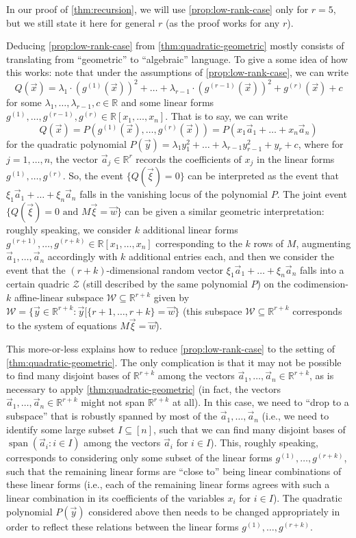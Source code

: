 \documentclass[english]{article}
\theoremstyle{remark}
\numberwithin{equation}{section}
\numberwithin{figure}{section}
\newcommand{\RR}{\mathbb{R}}
\newcommand{\mb}{\mathbb}
\newcommand{\mc}{\mathcal}
\newcommand{\on}{\operatorname}
\begin{document}
In our proof of \cref{thm:recursion}, we will use \cref{prop:low-rank-case} only for $r=5$, but we still state it here for general $r$ (as the proof works for any $r$).

Deducing \cref{prop:low-rank-case} from \cref{thm:quadratic-geometric} mostly consists of translating from ``geometric'' to ``algebraic'' language.
To give a some idea of how this works: note that under the assumptions of \cref{prop:low-rank-case}, we can write \[Q(\vec x)=\lambda_{1}\cdot (g^{({1})}(\vec{x}))^2+\dots+\lambda_{r-1} \cdot (g^{({r-1})}(\vec{x}))^2+g^{(r)}(\vec x)+c\] for some $\lambda_1,\dots,\lambda_{r-1},c\in \RR$ and some linear forms $g^{({1})},\dots,g^{({r-1})},g^{(r)} \in \mathbb{R}[x_1,\dots,x_n]$. That is to say, we can write
\[Q(\vec x)=P(g^{(1)}(\vec{x}),\dots,g^{(r)}(\vec{x}))=P(x_1\vec a_1+\dots+x_n\vec a_n)\]
for the quadratic polynomial $P(\vec{y})=\lambda_1 y_1^2+\dots+\lambda_{r-1} y_{r-1}^2+y_r+c$, where for $j=1,\dots,n$, the vector $\vec a_j\in \mb R^r$ records the coefficients of $x_j$ in the linear forms $g^{({1})},\dots,g^{(r)}$. So, the event $\{Q(\vec \xi)=0\}$ can be interpreted as the event that $\xi_1\vec a_1+\dots+\xi_n\vec a_n$ falls in the vanishing locus of the polynomial $P$. The joint event $\{Q(\vec \xi)=0\text{ and }M\vec\xi=\vec w \}$ can be given a similar geometric interpretation: roughly speaking, we consider $k$ additional linear forms $g^{({r+1})},\dots,g^{({r+k})}\in \mathbb{R}[x_1,\dots,x_n]$ corresponding to the $k$ rows of $M$,
augmenting $\vec a_1,\dots,\vec a_n$ accordingly with $k$ additional entries each, and then we consider the event that the $(r+k)$-dimensional random vector $\xi_1\vec a_1+\dots+\xi_n\vec a_n$ falls into a certain quadric $\mc Z$ (still described by the same polynomial $P$) on the codimension-$k$ affine-linear subspace $\mc W\subseteq \RR^{r+k}$ given by $\mc W=
\{\vec y \in \RR^{r+k} : \vec y [\{r+1,\dots,r+k\}=\vec w\}$ (this subspace $\mc W\subseteq \RR^{r+k}$ corresponds to the system of equations $M\vec\xi=\vec w$).


This more-or-less explains how to reduce \cref{prop:low-rank-case} to the setting of \cref{thm:quadratic-geometric}. The only complication is that it may not be possible to find many disjoint bases of $\RR^{r+k}$ among the vectors $\vec a_1,\dots,\vec a_n\in \RR^{r+k}$, as is necessary to apply \cref{thm:quadratic-geometric} (in fact, the vectors $\vec a_1,\dots,\vec a_n\in \RR^{r+k}$ might not span $\RR^{r+k}$ at all). In this case, we need to ``drop to a subspace'' that is robustly spanned by most of the $\vec a_1,\dots,\vec a_n$ (i.e., we need to identify some large subset $I\subseteq [n]$, such that we can find many disjoint bases of $\on{span}(\vec a_i:i\in I)$ among the vectors $\vec a_i$ for $i\in I$). This, roughly speaking, corresponds to considering only some subset of the linear forms $g^{({1})},\dots,g^{(r+k)}$, such that the remaining linear forms are ``close to'' being linear combinations of these linear forms (i.e., each of the remaining linear forms agrees with such a linear combination in its coefficients of the variables $x_i$ for $i\in I$). The quadratic polynomial $P(\vec{y})$ considered above then needs to be changed appropriately in order to reflect these relations between the linear forms $g^{({1})},\dots,g^{(r+k)}$.
\end{document}
